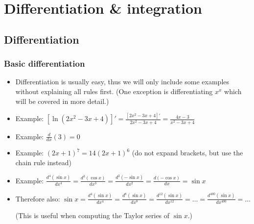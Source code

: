 \iffalse

MIT License

Copyright (c) 2023 Aron Hardeman

Permission is hereby granted, free of charge, to any person obtaining a copy
of this software and associated documentation files (the "Software"), to deal
in the Software without restriction, including without limitation the rights
to use, copy, modify, merge, publish, distribute, sublicense, and/or sell
copies of the Software, and to permit persons to whom the Software is
furnished to do so, subject to the following conditions:

The above copyright notice and this permission notice shall be included in all
copies or substantial portions of the Software.

THE SOFTWARE IS PROVIDED "AS IS", WITHOUT WARRANTY OF ANY KIND, EXPRESS OR
IMPLIED, INCLUDING BUT NOT LIMITED TO THE WARRANTIES OF MERCHANTABILITY,
FITNESS FOR A PARTICULAR PURPOSE AND NONINFRINGEMENT. IN NO EVENT SHALL THE
AUTHORS OR COPYRIGHT HOLDERS BE LIABLE FOR ANY CLAIM, DAMAGES OR OTHER
LIABILITY, WHETHER IN AN ACTION OF CONTRACT, TORT OR OTHERWISE, ARISING FROM,
OUT OF OR IN CONNECTION WITH THE SOFTWARE OR THE USE OR OTHER DEALINGS IN THE
SOFTWARE.

\fi\section{Differentiation \& integration}
\subsection{Differentiation}
\begin{frame}

\frametitle{Basic differentiation}

\begin{itemize}
\item  Differentiation is usually easy, thus we will only include some examples without explaining all rules first. (One exception is differentiating $x^x$ which will be covered in more detail.)
\pause\item Example: $[\ln(2x^2-3x+4)]'=\frac{[2x^2-3x+4]'}{2x^2-3x+4}=\frac{4x-3}{x^2-3x+4}$
\pause\item Example: $\frac{d}{dx}(3) = 0$
\pause\item Example: $(2x+1)^{7}=14(2x+1)^6$ (do not expand brackets, but use the chain rule instead) 
\pause\item Example: $\frac{d^4(\sin x)}{dx^4}=\frac{d^3(\cos x)}{dx^3}=\frac{d^2(-\sin x)}{dx^2}=\frac{d(-\cos x)}{dx}=\sin x$
\pause\item Therefore also: $\sin x = \frac{d^4(\sin x)}{dx^4} =  \frac{d^8(\sin x)}{dx^8} =  \frac{d^{12}(\sin x)}{dx^{12}}=  \hdots=\frac{d^{400}(\sin x)}{dx^{400}}=\hdots$

(This is useful when computing the Taylor series of $\sin x$.)
\end{itemize}


\end{frame}

